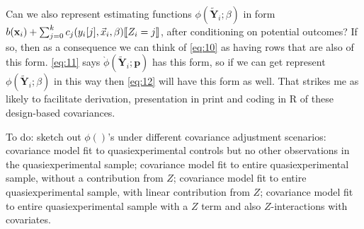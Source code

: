 \documentclass{article}
\DeclarePairedDelimiter{\indicator}{\llbracket}{\rrbracket}
\begin{document}
Can we also represent estimating functions
$\phi(\tilde{\mathbf{Y}}_{i}; \beta)$ in form
$b(\mathbf{x}_{i}) + \sum_{j=0}^{k}c_{j}(y_{i}[j], \vec{x}_{i}, \beta)\indicator{Z_{i}=j}$, after conditioning
on potential outcomes? If so, then as a consequence we can think of
\eqref{eq:10} as having rows that are also of this form.
\eqref{eq:11} says $\grave{\phi}(\tilde{\mathbf{Y}}_{i}; \mathbf{p})$
has this form, so if we can get represent
$\phi(\tilde{\mathbf{Y}}_{i}; \beta)$ in this way then \eqref{eq:12}
will have this form as well. That strikes me as likely to facilitate
derivation, 
presentation in print and coding in R of these design-based covariances. 

To do:
sketch out $\phi()$'s under different covariance adjustment scenarios:
covariance model fit to quasiexperimental controls but no other
observations in the quasiexperimental sample; covariance model fit to
entire quasiexperimental sample, without a contribution from $Z$;
covariance model fit to entire quasiexperimental sample, with linear
contribution from $Z$; covariance model fit to entire
quasiexperimental sample with a $Z$ term and also $Z$-interactions
with covariates.

\end{document}
